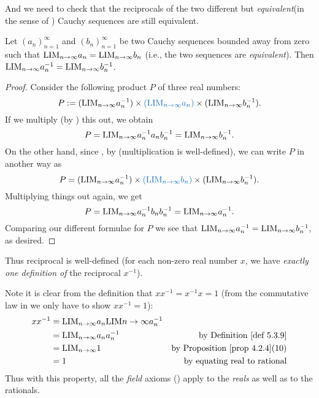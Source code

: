 And we need to check that the reciprocals of the two different but \emph{equivalent}(in the sense of ) Cauchy sequences are still equivalent.

\begin{lemma}  \label{lem 5.3.17}
Let \((a_n)_{n = 1}^{\infty}\) and \((b_n)_{n = 1}^{\infty}\) be two Cauchy sequences bounded away from zero such that \(\text{LIM}_{n \to \infty} a_n = \text{LIM}_{n \to \infty} b_n\)
(i.e., the two sequences are \emph{equivalent}).
Then \(\text{LIM}_{n \to \infty} a_n^{-1} = \text{LIM}_{n \to \infty} b_n^{-1}\).
\end{lemma}

\begin{proof}
Consider the following product \(P\) of three real numbers:
\[
    P := (\LIM_{n \toINF} a_n^{-1}) \X \BLUE{(\LIM_{n \toINF} a_n)} \X (\LIM_{n \toINF} b_n^{-1}).
\]
If we multiply (by ) this out, we obtain
\[
    P = \text{LIM}_{n \to \infty} a_n^{-1} a_n b_n^{-1} = \text{LIM}_{n \to \infty} b_n^{-1}.
\]
On the other hand, since , by (multiplication is well-defined), we can write \(P\) in another way as
\[
     P = (\LIM_{n \toINF} a_n^{-1}) \X \BLUE{(\LIM_{n \toINF} b_n)} \X (\LIM_{n \toINF} b_n^{-1}).
\]
Multiplying things out again, we get
\[
    P = \text{LIM}_{n \to \infty} a_n^{-1} b_n b_n^{-1} = \text{LIM}_{n \to \infty} a_n^{-1}.
\]
Comparing our different formulae for \(P\) we see that \(\text{LIM}_{n \to \infty} a_n^{-1} = \text{LIM}_{n \to \infty} b_n^{-1}\), as desired.
\end{proof}

Thus reciprocal is well-defined (for each non-zero real number \(x\), we have \emph{exactly one definition of} the reciprocal \(x^{-1}\)).

\begin{note}
Note it is clear from the definition that \(xx^{-1} = x^{-1}x = 1\) (from the commutative law in  we only have to show \(xx^{-1} = 1\)):
\begin{align*}
    xx^{-1} & = \LIM_{n \toINF} a_n \LIM{n \toINF} a_n^{-1} \\
            & = \LIM_{n \toINF} a_n a_n^{-1} & \text{by \DEF{5.3.9}} \\
            & = \LIM_{n \toINF} 1 & \text{by \PROP{4.2.4}(10)} \\
            & = 1 & \text{by equating real to rational}
\end{align*}
Thus with this property, all the \emph{field} axioms () apply to the \emph{reals} as well as to the rationals.
\end{note}

